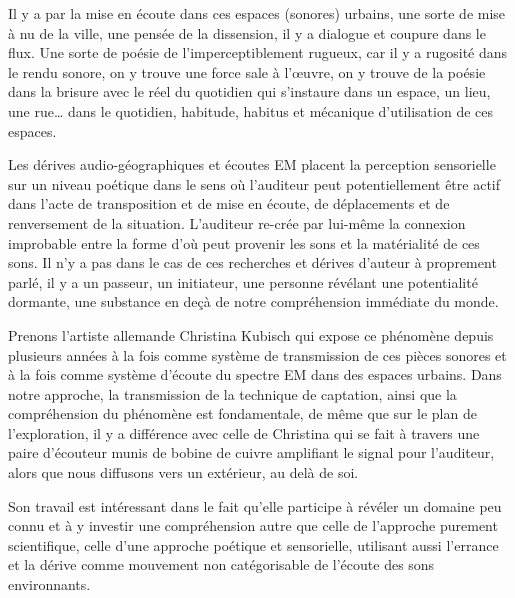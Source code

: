 {Il y a par la mise en \'ecoute dans ces espaces (sonores) urbains, une
sorte de mise \`a nu de la ville, une pens\'ee de la dissension, il y a
dialogue et coupure dans le flux. Une sorte de po\'esie de
l'imperceptiblement rugueux, car il y a rugosit\'e
dans le rendu sonore, on y trouve une force sale \`a
l'{\oe}uvre, on y trouve de la po\'esie dans la brisure
avec le r\'eel du quotidien qui s'instaure dans un
espace, un lieu, une rue{\dots} dans le quotidien, habitude, habitus et
m\'ecanique d'utilisation de ces espaces.

Les d\'erives audio{}-g\'eographiques et \'ecoutes EM placent la
perception sensorielle sur un niveau po\'etique dans le sens o\`u
l'auditeur peut potentiellement \^etre actif dans
l'acte de transposition et de mise en \'ecoute, de
d\'eplacements et de renversement de la situation.
L'auditeur re{}-cr\'ee par lui{}-m\^eme la connexion
improbable entre la forme d'o\`u peut provenir les
sons et la mat\'erialit\'e de ces sons. Il n'y a pas
dans le cas de ces recherches et d\'erives d'auteur
\`a proprement parl\'e, il y a un passeur, un initiateur, une personne
r\'ev\'elant une potentialit\'e dormante, une substance en de\c{c}\`a
de notre compr\'ehension imm\'ediate du monde.


Prenons l'artiste allemande Christina Kubisch qui
expose ce ph\'enom\`ene depuis plusieurs ann\'ees \`a la fois comme
syst\`eme de transmission de ces pi\`eces sonores et \`a la fois comme
syst\`eme d'\'ecoute du spectre EM dans des espaces
urbains. Dans notre approche, la transmission de la technique de
captation, ainsi que la compr\'ehension du ph\'enom\`ene est
fondamentale, de m\^eme que sur le plan de
l'exploration, il y a diff\'erence avec celle de
Christina qui se fait \`a travers une paire
d'\'ecouteur munis de bobine de cuivre amplifiant le
signal pour l'auditeur, alors que nous diffusons vers
un ext\'erieur, au del\`a de soi.

Son travail est int\'eressant dans le fait
qu'elle participe \`a r\'ev\'eler un domaine peu
connu et \`a y investir une compr\'ehension autre que celle de
l'approche purement scientifique, celle
d'une approche po\'etique et sensorielle, utilisant
aussi l'errance et la d\'erive comme mouvement non
cat\'egorisable de l'\'ecoute des sons environnants.

}
